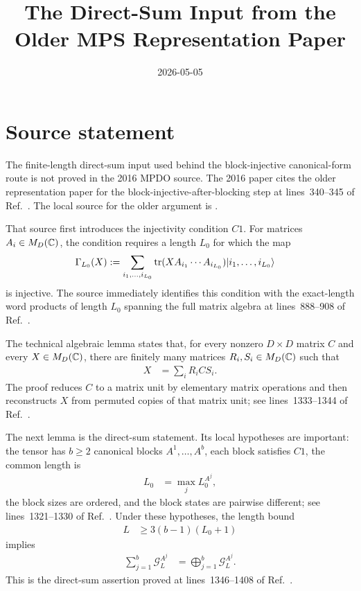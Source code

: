 \documentclass{article}
\title{The Direct-Sum Input from the Older MPS Representation Paper}
\author{}
\date{2026-05-05}
\begin{document}
\maketitle
{}

\section{Source statement}

The finite-length direct-sum input used behind the block-injective
canonical-form route is not proved in the 2016 MPDO source. The 2016 paper
cites the older representation paper for the block-injective-after-blocking
step at lines~340--345 of Ref.~\cite{Cirac2016MPDO_arXiv}. The local source for
the older argument is .

That source first introduces the injectivity condition $C1$. For matrices
$A_i\in M_D(\mathbb{C})$, the condition requires a length $L_0$ for which the map
\begin{align}
    \Gamma_{L_0}(X)
     & :=
    \sum_{i_1,\ldots,i_{L_0}}
    \operatorname{tr}(XA_{i_1}\cdots A_{i_{L_0}})
    |i_1,\ldots,i_{L_0}\rangle
    \label{eq:direct-sum_gamma_map}
\end{align}
is injective. The source immediately identifies this condition with the
exact-length word products of length $L_0$ spanning the full matrix algebra
at lines~888--908 of Ref.~\cite{PerezGarcia2007MPSReps}.

The technical algebraic lemma states that, for every nonzero
$D\times D$ matrix $C$ and every $X\in M_D(\mathbb{C})$, there are finitely many
matrices $R_i,S_i\in M_D(\mathbb{C})$ such that
\begin{align}
    X
     & =\sum_i R_iCS_i.
    \label{eq:direct-sum_matrix_factorization}
\end{align}
The proof reduces $C$ to a matrix unit by elementary matrix operations and
then reconstructs $X$ from permuted copies of that matrix unit; see
lines~1333--1344 of Ref.~\cite{PerezGarcia2007MPSReps}.

The next lemma is the direct-sum statement. Its local hypotheses are important:
the tensor has $b\geq 2$ canonical blocks
$A^1,\ldots,A^b$, each block satisfies $C1$, the common length is
\begin{align}
    L_0
     & =\max_j L_0^{A^j},
    \label{eq:direct-sum_common_injectivity_length}
\end{align}
the block sizes are ordered, and the block states are pairwise different; see
lines~1321--1330 of Ref.~\cite{PerezGarcia2007MPSReps}. Under these
hypotheses, the length bound
\begin{align}
    L
     & \geq 3(b-1)(L_0+1)
    \label{eq:direct-sum_source_length_bound}
\end{align}
implies
\begin{align}
    \sum_{j=1}^b\mathcal G_L^{A^j}
     & =\bigoplus_{j=1}^b\mathcal G_L^{A^j}.
    \label{eq:direct-sum_source_image_space_directness}
\end{align}
This is the direct-sum assertion proved at lines~1346--1408 of
Ref.~\cite{PerezGarcia2007MPSReps}.
\end{document}
